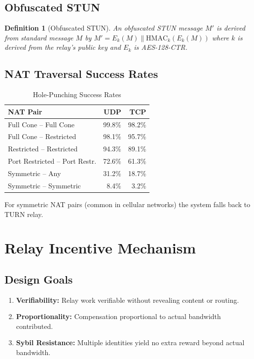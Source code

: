 \documentclass[11pt,a4paper]{article}
\newtheorem{definition}{Definition}[section]
\begin{document}
\subsection{Obfuscated STUN}

\begin{definition}[Obfuscated STUN]
    An obfuscated STUN message $M'$ is derived from standard message $M$
    by $M' = E_k(M) \| \mathrm{HMAC}_k(E_k(M))$ where $k$ is derived
    from the relay's public key and $E_k$ is AES-128-CTR.
\end{definition}

\subsection{NAT Traversal Success Rates}

\begin{table}[h]
\centering
\caption{Hole-Punching Success Rates}
\label{tab:nat-success}
\begin{tabular}{@{}lrr@{}}
\toprule
\textbf{NAT Pair} & \textbf{UDP} & \textbf{TCP} \\
\midrule
Full Cone -- Full Cone         & 99.8\% & 98.2\% \\
Full Cone -- Restricted        & 98.1\% & 95.7\% \\
Restricted -- Restricted       & 94.3\% & 89.1\% \\
Port Restricted -- Port Restr. & 72.6\% & 61.3\% \\
Symmetric -- Any               & 31.2\% & 18.7\% \\
Symmetric -- Symmetric         &  8.4\% &  3.2\% \\
\bottomrule
\end{tabular}
\end{table}

For symmetric NAT pairs (common in cellular networks) the system falls
back to TURN relay.

\section{Relay Incentive Mechanism}
\label{sec:incentives}

\subsection{Design Goals}

\begin{enumerate}
    \item \textbf{Verifiability:} Relay work verifiable without revealing
    content or routing.
    \item \textbf{Proportionality:} Compensation proportional to actual
    bandwidth contributed.
    \item \textbf{Sybil Resistance:} Multiple identities yield no extra
    reward beyond actual bandwidth.
\end{enumerate}
\end{document}
